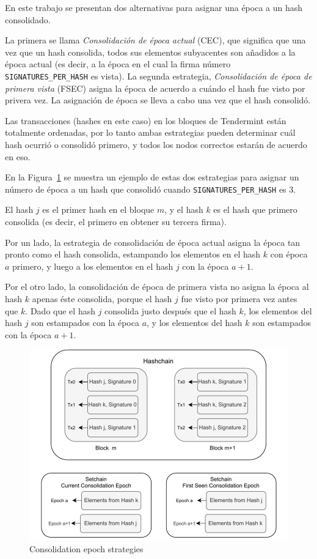 %

En este trabajo se presentan dos alternativas para asignar una época a un hash consolidado.

%
La primera se llama \textit{Consolidación de época actual} (CEC), que significa que 
una vez que un hash consolida, todos sus elementos subyacentes son añadidos a la época actual
(es decir, a la época en el cual la firma número \texttt{SIGNATURES\_PER\_HASH} es vista).
%
La segunda estrategia, \textit{Consolidación de época de primera vista} (FSEC) asigna la época
de acuerdo a cuándo el hash fue visto por privera vez. La asignación de época se lleva
a cabo una vez que el hash consolidó. 

%
Las transacciones (hashes en este caso) en los bloques de Tendermint están totalmente ordenadas,
por lo tanto ambas estrategias pueden determinar cuál hash ocurrió o consolidó primero, y
todos los nodos correctos estarán de acuerdo en eso.

%

En la Figura~\ref{fig:consolidation_epoch} se muestra un ejemplo de estas dos estrategias para asignar
un número de época a un hash que consolidó cuando \texttt{SIGNATURES\_PER\_HASH} es 3.

%
El hash $j$ es el primer hash en el bloque $m$, y el hash $k$ es el hash que primero consolida
(es decir, el primero en obtener su tercera firma).

%
Por un lado, la estrategia de consolidación de época actual asigna la época tan pronto como
el hash consolida, estampando los elementos en el hash $k$ con época $a$ primero, y luego
a los elementos en el hash $j$ con la época $a+1$.

%
Por el otro lado, la consolidación de época de primera vista no asigna la época al hash $k$
apenas éste consolida, porque el hash $j$ fue visto por primera vez antes que $k$.
%
Dado que el hash $j$ consolida justo después que el hash $k$, los elementos del hash $j$ son
estampados
con la época $a$, y los elementos del hash $k$ son estampados con la época $a+1$. 


\begin{figure}
  \centering
  \includegraphics[scale=0.5]{figures/consolidation_epoch.pdf}
  \caption{Consolidation epoch strategies}
  \label{fig:consolidation_epoch}
\end{figure}

